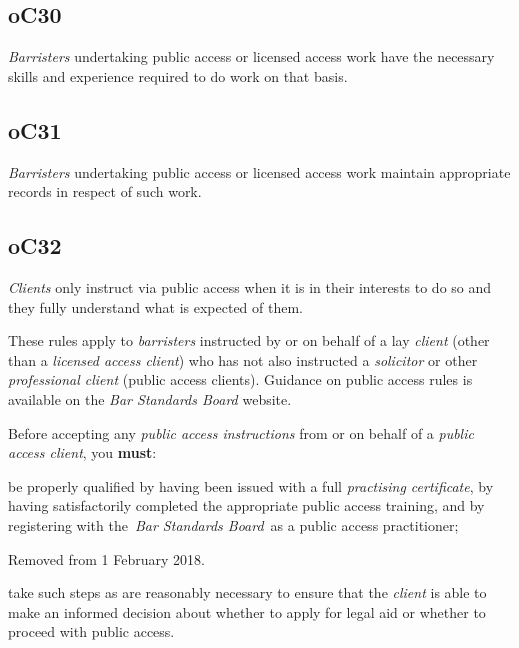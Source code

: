 \subsection{\color{bleu}oC30}

\emph{Barristers} undertaking public access or licensed access work have
the necessary skills and experience required to do work on that basis.

\subsection{\color{bleu}oC31}

\emph{Barristers} undertaking public access or licensed access work
maintain appropriate records in respect of such work.

\subsection{\color{bleu}oC32}

\emph{Clients} only instruct via public access when it is in their
interests to do so and they fully understand what is expected of them.




These rules apply to \emph{barristers} instructed by or on behalf of a
lay \emph{client} (other than a \emph{licensed access client}) who has
not also instructed a \emph{solicitor} or other \emph{professional
client} (public access clients). Guidance on public access rules is
available on the \emph{Bar Standards Board} website.


Before accepting any \emph{public access instructions} from or on behalf
of a \emph{public access client}, you \textcolor{myred}{\textbf{must}}:
\begin{numlist}\item be properly qualified by having been issued with a full
\emph{practising certificate}, by having satisfactorily completed the
appropriate public access training, and by registering with
the~\emph{Bar Standards Board}~as a public access practitioner;
\item Removed from 1 February 2018.
\item take such steps as are reasonably necessary to ensure that the
\emph{client} is able to make an informed decision about whether to
apply for legal aid or whether to proceed with public access.
\end{numlist}

